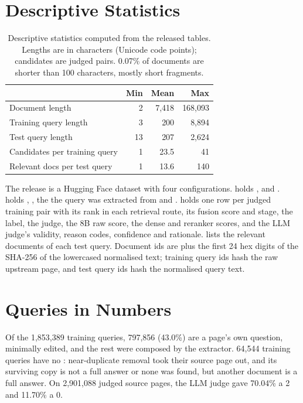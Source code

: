 \section{Descriptive Statistics}
\label{app:stats}

\begin{table}[!ht]
\centering
\small
\begin{tabular}{lrrr}
\toprule
 & Min & Mean & Max \\
\midrule
Document length & 2 & 7,418 & 168,093 \\
Training query length & 3 & 200 & 8,894 \\
Test query length & 13 & 207 & 2,624 \\
Candidates per training query & 1 & 23.5 & 41 \\
Relevant docs per test query & 1 & 13.6 & 140 \\
\bottomrule
\end{tabular}
\caption{Descriptive statistics computed from the released tables. Lengths are in characters (Unicode code points); candidates are judged pairs. 0.07\% of documents are shorter than 100 characters, mostly short fragments.}
\label{tab:desc}
\end{table}

The release is a Hugging Face dataset with four configurations.  holds ,  and .  holds , , the  the query was extracted from and .  holds one row per judged training pair with its rank in each retrieval route, its fusion score and stage, the label, the judge, the 8B raw score, the dense and reranker scores, and the LLM judge's validity, reason codes, confidence and rationale.  lists the relevant documents of each test query. Document ids are  plus the first 24 hex digits of the SHA-256 of the lowercased normalised text; training query ids hash the raw upstream page, and test query ids hash the normalised query text.

\section{Queries in Numbers}
\label{app:queries}

Of the 1,853,389 training queries, 797,856 (43.0\%) are a page's own question, minimally edited, and the rest were composed by the extractor. 64,544 training queries have no : near-duplicate removal took their source page out, and its surviving copy is not a full answer or none was found, but another document is a full answer. On 2,901,088 judged source pages, the LLM judge gave 70.04\% a 2 and 11.70\% a 0.
